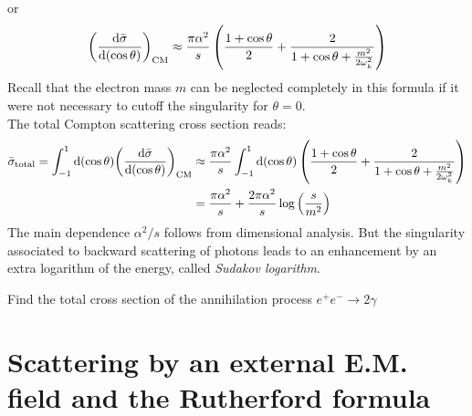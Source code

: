 \documentclass[TheoreticalPhy_ModB.tex]{subfiles}
\begin{document}
or
\[{\left(\frac{\textup{d}\bar\sigma}{\textup{d}(\cos\theta)}\right)}_{\textup{CM}}
\approx\frac{\pi\alpha^2}{s}\left(\frac{1+\cos\theta}{2}+\frac{2}{1+\cos\theta+\frac{m^2}{2\omega_k^2}}\right)\]
Recall that the electron mass $m$ can be neglected completely in this formula if it were not necessary to cutoff the singularity for $\theta=0$.\\
The total Compton scattering cross section reads:
\begin{align*}
\bar\sigma_{\textup{total}}=\int_{-1}^1\textup{d}(\cos\theta){\left(\frac{\textup{d}\bar\sigma}{\textup{d}(\cos\theta)}\right)}_{\textup{CM}}
&\approx 
\frac{\pi\alpha^2}{s}\int_{-1}^1\textup{d}(\cos\theta)\left(\frac{1+\cos\theta}{2}+\frac{2}{1+\cos\theta+\frac{m^2}{2\omega_k^2}}\right)\\
&=\frac{\pi\alpha^2}{s}+\frac{2\pi\alpha^2}{s}\log\left(\frac s{m^2}\right)
\end{align*}
The main dependence $\alpha^2/s$ follows from dimensional analysis. But the singularity associated to backward scattering of photons leads to an enhancement by an extra logarithm of the energy, called \emph{Sudakov logarithm}.

\begin{example}
Find the total cross section of the annihilation process $e^+e^-\rightarrow2\gamma$
\end{example}


\section{Scattering by an external E.M. field and the Rutherford formula}
\end{document}

